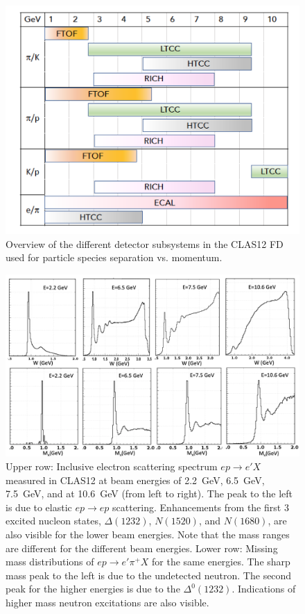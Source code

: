 \documentclass[final,3p,twocolumn]{elsarticle}
\begin{document}
\begin{figure}[htp!]
\centerline{\includegraphics[width=1.0\columnwidth]{CLAS12-pid.png}}
\caption{Overview of the different detector subsystems in the CLAS12 FD used for particle species separation
  vs. momentum.}
\label{pid1}
\end{figure} 

\begin{figure}[t!]
\centerline{\includegraphics[width=2.0\columnwidth]{W-spectrum.png}}
\caption{Upper row: Inclusive electron scattering spectrum $ep \to e' X$ measured in CLAS12 at beam energies 
  of 2.2~GeV, 6.5~GeV, 7.5~GeV, and at 10.6~GeV (from left to right). The peak to the left is due to elastic
  $ep \to ep$ scattering. Enhancements from the first 3 excited nucleon states, $\Delta(1232)$, $N(1520)$,
  and $N(1680)$, are also visible for the lower beam energies. Note that the mass ranges  are different for the
  different beam energies. Lower row: Missing mass distributions of $ep\to e' \pi^+X$ for the same energies. The
  sharp mass peak to the left is due to the undetected neutron. The second peak for the higher energies is due to
  the $\Delta^0(1232)$. Indications of higher mass neutron excitations are also visible.} 
\label{spectrum}
\end{figure} 
\end{document}
